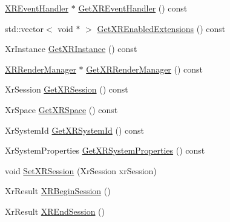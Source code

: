 \begin{DoxyCompactItemize}
\item 
\mbox{\hyperlink{class_open_x_r_provider_1_1_x_r_event_handler}{X\+R\+Event\+Handler}} $\ast$ \mbox{\hyperlink{class_open_x_r_provider_1_1_x_r_provider_a86abca051fdf068a7f4a0e4d8f57095e}{Get\+X\+R\+Event\+Handler}} () const
\item 
std\+::vector$<$ void $\ast$ $>$ \mbox{\hyperlink{class_open_x_r_provider_1_1_x_r_provider_adcfd16c34593dd486444db07f5a6d6b8}{Get\+X\+R\+Enabled\+Extensions}} () const
\item 
Xr\+Instance \mbox{\hyperlink{class_open_x_r_provider_1_1_x_r_provider_a9e108c811e6fbb6ddd1e00e96c675fba}{Get\+X\+R\+Instance}} () const
\item 
\mbox{\hyperlink{class_open_x_r_provider_1_1_x_r_render_manager}{X\+R\+Render\+Manager}} $\ast$ \mbox{\hyperlink{class_open_x_r_provider_1_1_x_r_provider_a23af3c59dab3caab02728403adae13f4}{Get\+X\+R\+Render\+Manager}} () const
\item 
Xr\+Session \mbox{\hyperlink{class_open_x_r_provider_1_1_x_r_provider_adfd13c0c76ff0fec35674d343ba55c06}{Get\+X\+R\+Session}} () const
\item 
Xr\+Space \mbox{\hyperlink{class_open_x_r_provider_1_1_x_r_provider_a53db40884126aaa44f32953fa889fb76}{Get\+X\+R\+Space}} () const
\item 
Xr\+System\+Id \mbox{\hyperlink{class_open_x_r_provider_1_1_x_r_provider_a8b2a2dd1e3497a8395b496be5eff6f2c}{Get\+X\+R\+System\+Id}} () const
\item 
Xr\+System\+Properties \mbox{\hyperlink{class_open_x_r_provider_1_1_x_r_provider_a6a1d17df601888feeb5481fc1d49bae2}{Get\+X\+R\+System\+Properties}} () const
\item 
void \mbox{\hyperlink{class_open_x_r_provider_1_1_x_r_provider_a96ffa9e4f37cc4967cf41fce027e5234}{Set\+X\+R\+Session}} (Xr\+Session xr\+Session)
\item 
Xr\+Result \mbox{\hyperlink{class_open_x_r_provider_1_1_x_r_provider_a5599fa1da5f74f40e02fdf2a8d3f7a55}{X\+R\+Begin\+Session}} ()
\item 
Xr\+Result \mbox{\hyperlink{class_open_x_r_provider_1_1_x_r_provider_a972be4b6da3dbc7c2db5e5d98c815401}{X\+R\+End\+Session}} ()
\end{DoxyCompactItemize}
